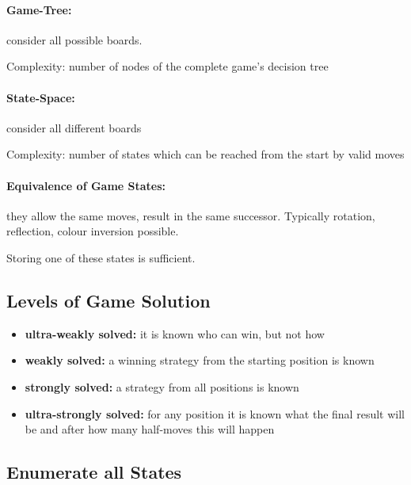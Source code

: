 \documentclass[11pt]{article}
\begin{document}
\paragraph{Game-Tree:} consider all possible boards.

Complexity: number of nodes of the complete game's decision tree
\paragraph{State-Space:} consider all different boards

Complexity: number of states which can be reached from the start by valid moves

\paragraph{Equivalence of Game States:} they allow the same moves, result in the same successor. Typically rotation, reflection, colour inversion possible.

Storing one of these states is sufficient.

\subsection{Levels of Game Solution}

\begin{itemize}
\item \textbf{ultra-weakly solved:} it is known who can win, but not how
\item \textbf{weakly solved:} a winning strategy from the starting position is known
\item \textbf{strongly solved:} a strategy from all positions is known
\item \textbf{ultra-strongly solved:} for any position it is known what the final result will be and after how many half-moves this will happen
\end{itemize}

\subsection{Enumerate all States}
\end{document}
